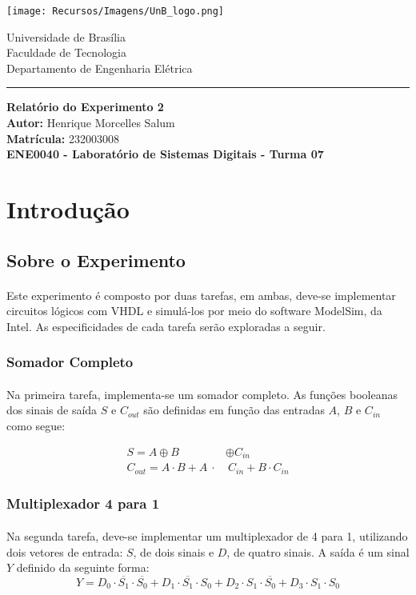 \documentclass[a4paper,12pt]{article}
\newcommand{\capa}{
    \begin{titlepage}
        \begin{multicols}{2}
            \begin{flushleft}
                \texttt{[image: Recursos/Imagens/UnB\_logo.png]}
            \end{flushleft}
            \columnbreak
            \begin{flushright}
                Universidade de Brasília \\
                Faculdade de Tecnologia \\
                Departamento de Engenharia Elétrica
            \end{flushright}
        \end{multicols}
        \begin{center}
        \vspace{-20pt}
        \rule{\textwidth}{0.4pt}
        \end{center}
        \vspace{0.6cm}
        \begin{center}
            {\Huge \textbf{Relatório do Experimento 2}} \\[1em]
            {\large \textbf{Autor:} Henrique Morcelles Salum} \\[0.5em]
            {\large \textbf{Matrícula:} 232003008} \\
            \vfill
            {\large \textbf{ENE0040 - Laboratório de Sistemas Digitais - Turma 07}} \\
        \end{center}
    \end{titlepage}
}
\begin{document}
\capa

\newpage
\tableofcontents
\newpage

\section{Introdução}

\subsection{Sobre o Experimento}
\label{subsec:sobre_o_experimento}
\paragraph{}
Este experimento é composto por duas tarefas, em ambas, deve-se implementar circuitos lógicos com VHDL e simulá-los por meio do software ModelSim, da Intel. As especificidades de cada tarefa serão exploradas a seguir.

\subsubsection{Somador Completo}
\paragraph{}
Na primeira tarefa, implementa-se um somador completo. As funções booleanas dos sinais de saída $S$ e $C_{out}$ são definidas em função das entradas $A$, $B$ e $C_{in}$ como segue:

\begin{align*}
S = A \oplus B& \oplus C_{in} \\
C_{out} = A \cdot B + A \ \cdot& \ C_{in} + B \cdot C_{in}
\end{align*}

\subsubsection{Multiplexador 4 para 1}
\paragraph{}
Na segunda tarefa, deve-se implementar um multiplexador de 4 para 1, utilizando dois vetores de entrada: $S$, de dois sinais e $D$, de quatro sinais. A saída é um sinal $Y$ definido da seguinte forma:
\[
Y = D_0 \cdot \overline{S_1} \cdot \overline{S_0} + D_1 \cdot \overline{S_1} \cdot S_0 + D_2 \cdot S_1 \cdot \overline{S_0} + D_3 \cdot S_1 \cdot S_0
\]
\end{document}
